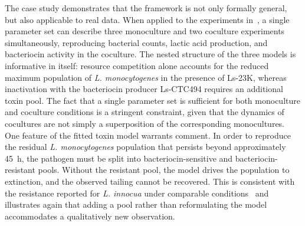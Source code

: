\documentclass[10pt,1p,authoryear]{elsarticle}
\numberwithin{equation}{section}
\begin{document}
%
The case study demonstrates that the framework is not only formally general, but also applicable to real data. When applied to the experiments in~\citet{ferrer-bustinsAntilisterialEffect2024}, a single parameter set can describe three monoculture and two coculture experiments simultaneously, reproducing bacterial counts, lactic acid production, and bacteriocin activity in the coculture.
The nested structure of the three models is informative in itself: resource competition alone accounts for the reduced maximum population of \textit{L. monocytogenes} in the presence of Ls-23K, whereas inactivation with the bacteriocin producer Ls-CTC494 requires an additional toxin pool. The fact that a single parameter set is sufficient for both monoculture and coculture conditions is a stringent constraint, given that the dynamics of cocultures are not simply a superposition of the corresponding monocultures.\\
%
One feature of the fitted toxin model warrants comment. In order to reproduce the residual \textit{L. monocytogenes} population that persists beyond approximately \SI{45}{\hour}, the pathogen must be split into bacteriocin-sensitive and bacteriocin-resistant pools. Without the resistant pool, the model drives the population to extinction, and the observed tailing cannot be recovered. This is consistent with the resistance reported for \textit{L. innocua} under comparable conditions~\citep{leroyModelingBacteriocin2005} and illustrates again that adding a pool rather than reformulating the model accommodates a qualitatively new observation.\\
\end{document}

